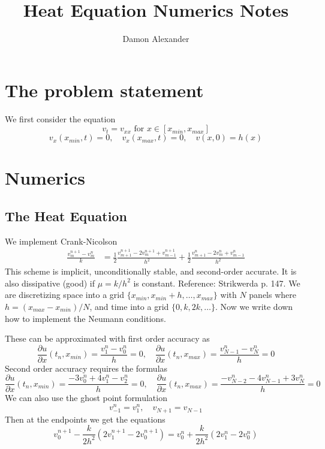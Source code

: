 \documentclass[a4paper,10pt]{article}
\title{Heat Equation Numerics Notes}
\author{Damon Alexander}
\newcommand{\der}[2]{\frac{\partial #1}{\partial #2}}
\begin{document}
\maketitle

\section{The problem statement}
We first consider the equation
\[v_t = v_{xx} \mbox{ for } x \in [x_{min}, x_{max}]\]
\[v_x(x_{min},t) = 0, \quad v_x(x_{max},t) = 0,\quad v(x,0) = h(x)\]

\section{Numerics}
\subsection*{The Heat Equation}
We implement Crank-Nicolson
\begin{align*}
 \frac{v_m^{n+1} - v_m^n}{k} &= \frac{1}{2} \frac{v_{m+1}^{n+1} - 2v_m^{n+1} + v_{m-1}^{n+1}}{h^2} + \frac{1}{2} \frac{v_{m+1}^n- 2v_m^n+ v_{m-1}^n}{h^2}
 \end{align*}
This scheme is implicit, unconditionally stable, and second-order accurate.  It is also dissipative (good) if $\mu = k/h^2$ is constant.  Reference: Strikwerda p. 147.  We are discretizing space into a grid $\{x_{min}, x_{min}+h, \dots, x_{max}\}$ with $N$ panels where $h = (x_{max}-x_{min})/N$, and time into a grid $\{0,k, 2k, \dots\}$.  Now we write down how to implement the Neumann conditions.


These can be approximated with first order accuracy as
\[ \der{u}{x}(t_n, x_{min}) = \frac{v_1^n - v_0^n}{h} = 0,\quad \der{u}{x}(t_n, x_{max}) = \frac{v_{N-1}^n - v_{N}^n}{h} = 0 \]
Second order accuracy requires the formulas
\[ \der{u}{x}(t_n, x_{min}) = \frac{-3v_0^n + 4 v_1^n - v_2^n}{h} = 0,\quad \der{u}{x}(t_n, x_{max}) = \frac{- v_{N -2}^n -4 v_{N-1}^n +3 v_{N}^n}{h} = 0 \]
We can also use the ghost point formulation
\[ v_{-1}^n = v_1^n, \quad v_{N+1} = v_{N-1}\]
Then at the endpoints we get the equations
\[v_0^{n+1} - \frac{k}{2h^2} (2v_1^{n+1} - 2 v_0^{n+1}) = v_0^n + \frac{k}{2h^2}(2 v_1^n - 2v_0^n)\]
\end{document}
